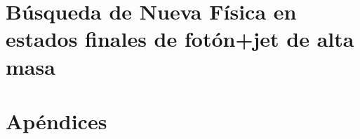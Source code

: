 \documentclass[a4paper,11pt,oneside,spanish]{memoir}
\begin{document}
\FloatBarrier
\part{Búsqueda de Nueva Física en estados finales de fotón+jet de alta masa}
\label{part:search}








\FloatBarrier



















\appendix
\part*{Apéndices}




\backmatter














\clearpage



% 
%
%
% 
% 
%
% 







\end{document}
